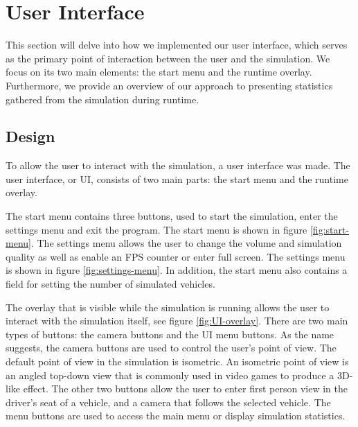 \section{User Interface}
    This section will delve into how we implemented our user interface, which serves as the primary point of interaction between the user and the simulation. We focus on its two main elements: the start menu and the runtime overlay. Furthermore, we provide an overview of our approach to presenting statistics gathered from the simulation during runtime.
    
    \subsection{Design}\label{subsection-design}
        To allow the user to interact with the simulation, a user interface was made. The user interface, or UI, consists of two main parts: the start menu and the runtime overlay. 
    
        The start menu contains three buttons, used to start the simulation, enter the settings menu and exit the program. The start menu is shown in figure \ref{fig:start-menu}. The settings menu allows the user to change the volume and simulation quality as well as enable an FPS counter or enter full screen. The settings menu is shown in figure 
        \ref{fig:settings-menu}. In addition, the start menu also contains a field for setting the number of simulated vehicles.
        
        
    
        The overlay that is visible while the simulation is running allows the user to interact with the simulation itself, see figure \ref{fig:UI-overlay}. There are two main types of buttons: the camera buttons and the UI menu buttons. As the name suggests, the camera buttons are used to control the user's point of view. The default point of view in the simulation is isometric. An isometric point of view is an angled top-down view that is commonly used in video games to produce a 3D-like effect. The other two buttons allow the user to enter first person view in the driver's seat of a vehicle, and a camera that follows the selected vehicle. The menu buttons are used to access the main menu or display simulation statistics.
        
